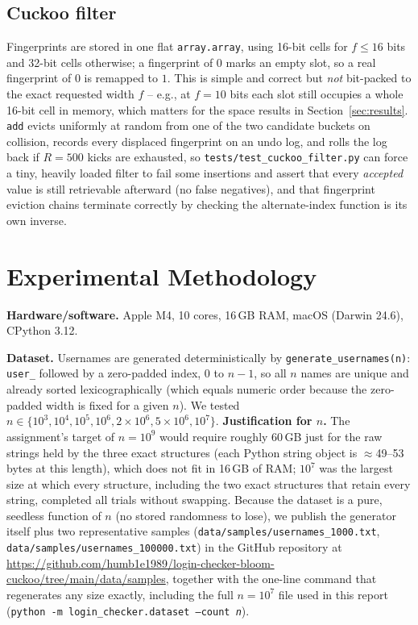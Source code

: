 \documentclass[acmsmall,screen,nonacm=true]{acmart}
\begin{document}
\subsection{Cuckoo filter}
Fingerprints are stored in one flat \texttt{array.array}, using 16-bit
cells for $f\le 16$ bits and 32-bit cells otherwise; a fingerprint of $0$
marks an empty slot, so a real fingerprint of $0$ is remapped to $1$. This
is simple and correct but \emph{not} bit-packed to the exact requested
width $f$ -- e.g., at $f=10$ bits each slot still occupies a whole 16-bit
cell in memory, which matters for the space results in
Section~\ref{sec:results}. \texttt{add} evicts uniformly at random from one
of the two candidate buckets on collision, records every displaced
fingerprint on an undo log, and rolls the log back if $R=500$ kicks are
exhausted, so \texttt{tests/test\_cuckoo\_filter.py} can force a tiny,
heavily loaded filter to fail some insertions and assert that every
\emph{accepted} value is still retrievable afterward (no false negatives),
and that fingerprint eviction chains terminate correctly by checking the
alternate-index function is its own inverse.

\section{Experimental Methodology}
\label{sec:methodology}

\textbf{Hardware/software.} Apple M4, 10 cores, 16\,GB RAM, macOS
(Darwin 24.6), CPython 3.12.

\textbf{Dataset.} Usernames are generated deterministically by
\texttt{generate\_usernames(n)}: \texttt{user\_} followed by a zero-padded
index, $0$ to $n-1$, so all $n$ names are unique and already sorted
lexicographically (which equals numeric order because the zero-padded
width is fixed for a given $n$). We tested
$n\in\{10^3,10^4,10^5,10^6,2{\times}10^6,5{\times}10^6,10^7\}$.
\textbf{Justification for $n$.} The assignment's target of $n=10^9$ would
require roughly 60\,GB just for the raw strings held by the three exact
structures (each Python string object is $\approx$49--53 bytes at this
length), which does not fit in 16\,GB of RAM; $10^7$ was the largest size
at which every structure, including the two exact structures that retain
every string, completed all trials without swapping. Because the dataset is
a pure, seedless function of $n$ (no stored randomness to lose), we publish
the generator itself plus two representative samples
(\texttt{data/samples/usernames\_1000.txt},
\texttt{data/samples/usernames\_100000.txt}) in the GitHub repository at
\url{https://github.com/humb1e1989/login-checker-bloom-cuckoo/tree/main/data/samples},
together with the one-line command that regenerates any size exactly,
including the full $n=10^7$ file used in this report
(\texttt{python -m login\_checker.dataset --count \textit{n}}).
\end{document}
